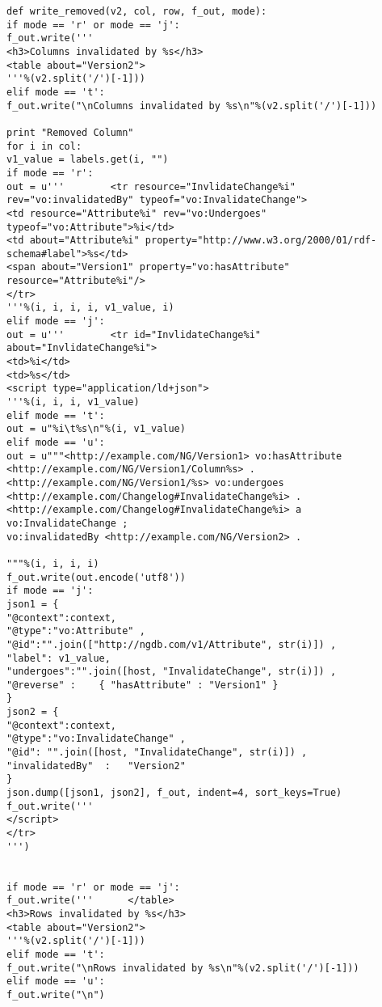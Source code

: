 \begin{verbatim}
def write_removed(v2, col, row, f_out, mode):
if mode == 'r' or mode == 'j':
f_out.write('''
<h3>Columns invalidated by %s</h3>
<table about="Version2">
'''%(v2.split('/')[-1]))
elif mode == 't':
f_out.write("\nColumns invalidated by %s\n"%(v2.split('/')[-1]))

print "Removed Column"
for i in col:
v1_value = labels.get(i, "")
if mode == 'r':
out = u'''        <tr resource="InvlidateChange%i" rev="vo:invalidatedBy" typeof="vo:InvalidateChange">
<td resource="Attribute%i" rev="vo:Undergoes" typeof="vo:Attribute">%i</td>
<td about="Attribute%i" property="http://www.w3.org/2000/01/rdf-schema#label">%s</td>
<span about="Version1" property="vo:hasAttribute" resource="Attribute%i"/>
</tr>
'''%(i, i, i, i, v1_value, i)
elif mode == 'j':
out = u'''        <tr id="InvlidateChange%i" about="InvlidateChange%i">
<td>%i</td>
<td>%s</td>
<script type="application/ld+json">
'''%(i, i, i, v1_value)
elif mode == 't':
out = u"%i\t%s\n"%(i, v1_value)
elif mode == 'u':
out = u"""<http://example.com/NG/Version1> vo:hasAttribute <http://example.com/NG/Version1/Column%s> .
<http://example.com/NG/Version1/%s> vo:undergoes <http://example.com/Changelog#InvalidateChange%i> .
<http://example.com/Changelog#InvalidateChange%i> a vo:InvalidateChange ;
vo:invalidatedBy <http://example.com/NG/Version2> .

"""%(i, i, i, i)
f_out.write(out.encode('utf8'))
if mode == 'j':
json1 = {
"@context":context,
"@type":"vo:Attribute" ,
"@id":"".join(["http://ngdb.com/v1/Attribute", str(i)]) ,
"label": v1_value,
"undergoes":"".join([host, "InvalidateChange", str(i)]) ,
"@reverse" :    { "hasAttribute" : "Version1" }
}
json2 = {
"@context":context,
"@type":"vo:InvalidateChange" ,
"@id": "".join([host, "InvalidateChange", str(i)]) ,
"invalidatedBy"  :   "Version2"
}
json.dump([json1, json2], f_out, indent=4, sort_keys=True)
f_out.write('''
</script>
</tr>
''')


if mode == 'r' or mode == 'j':
f_out.write('''      </table>
<h3>Rows invalidated by %s</h3>
<table about="Version2">
'''%(v2.split('/')[-1]))
elif mode == 't':
f_out.write("\nRows invalidated by %s\n"%(v2.split('/')[-1]))
elif mode == 'u':
f_out.write("\n")


\end{verbatim}
